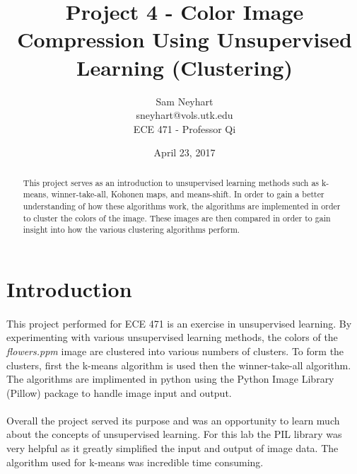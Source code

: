 \documentclass{article}
\begin{document}
\title{Project 4 - Color Image Compression Using Unsupervised Learning (Clustering)}
\author{Sam Neyhart\\ sneyhart@vols.utk.edu \\ECE 471 - Professor Qi}
\date{April 23, 2017}
\maketitle
\newpage


\begin{abstract}
This project serves as an introduction to unsupervised learning methods 
such as k-means, winner-take-all, Kohonen maps, and means-shift. In order
to gain a better understanding of how these algorithms work, the algorithms
are implemented in order to cluster the colors of the image. These images
are then compared in order to gain insight into how the various clustering
algorithms perform.
\end{abstract}
\newpage


\section*{Introduction}
\paragraph{}
This project performed for ECE 471 is an exercise in unsupervised learning.
By experimenting with various unsupervised learning methods, the colors
of the \textit{flowers.ppm} image are clustered into various numbers of clusters.
To form the clusters, first the k-means algorithm is used then the 
winner-take-all algorithm. The algorithms are implimented in python
using the Python Image Library (Pillow) package to handle image input and 
output.

\paragraph{} 
Overall the project served its purpose and was an opportunity to learn
much about the concepts of unsupervised learning. For this lab the 
PIL library was very helpful as it greatly simplified the input and output
of image data. The algorithm used for k-means was incredible time consuming.
\newpage


\end{document}
